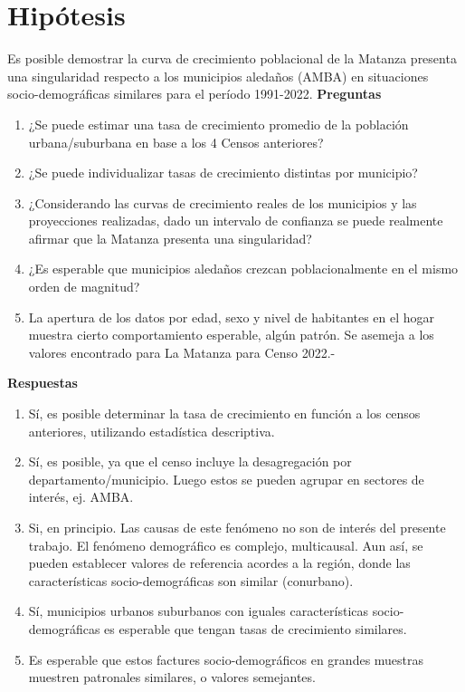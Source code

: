 \documentclass{article}
\theoremstyle{mytheoremstyle}
\theoremstyle{mytheoremstyle}
\theoremstyle{myproblemstyle}
\begin{document}
\section{Hipótesis}
Es posible demostrar la curva de crecimiento poblacional de la Matanza presenta una singularidad respecto a los municipios aledaños (AMBA) en situaciones socio-demográficas 
similares para el período 1991-2022. 
\smallskip
\textbf{Preguntas}
\begin{enumerate}
  \item ¿Se puede estimar una tasa de crecimiento promedio de la población urbana/suburbana en base a los 4 Censos anteriores?
  \item ¿Se puede individualizar tasas de crecimiento distintas por municipio?
  \item ¿Considerando las curvas de crecimiento reales de los municipios y las proyecciones realizadas, 
  dado un intervalo de confianza se puede realmente afirmar que la Matanza presenta una singularidad?
  \item ¿Es esperable que municipios aledaños crezcan poblacionalmente en el mismo orden de magnitud?
  \item La apertura de los datos por edad, sexo y nivel de habitantes en el hogar muestra cierto comportamiento esperable, algún patrón. Se asemeja a los valores encontrado para La Matanza para Censo 2022.-
\end{enumerate}

\textbf{Respuestas}
\begin{enumerate}
  \item Sí, es posible determinar la tasa de crecimiento en función a los censos anteriores, utilizando estadística descriptiva.
  \item Sí, es posible, ya que el censo incluye la desagregación por departamento/municipio. Luego estos se pueden agrupar en sectores de interés, ej. AMBA.
  \item	Si, en principio. Las causas de este fenómeno no son de interés del presente trabajo. El fenómeno demográfico es complejo, multicausal. Aun así, se pueden establecer valores de referencia acordes a la región, donde las características socio-demográficas son similar (conurbano).
  \item	Sí, municipios urbanos suburbanos con iguales características socio-demográficas es esperable que tengan tasas de crecimiento similares.
  \item	Es esperable que estos factures socio-demográficos en grandes muestras muestren patronales similares, o valores semejantes.
\end{enumerate}
\end{document}
